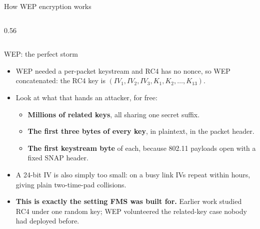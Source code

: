 \ifdefined\PRESENTATION\else\PassOptionsToClass{handout}{beamer}\fi\documentclass[aspectratio=169, lualatex]{beamer}
\begin{document}
\begin{frame}{How WEP encryption works}
\begin{columns}[c]
\begin{column}{0.56\textwidth}
\begin{center}
			\end{center}
		\end{column}
	\end{columns}
\end{frame}

\begin{frame}{WEP: the perfect storm}
	\begin{itemize}[<+->]
		\item WEP needed a per-packet keystream and RC4 has no nonce, so WEP concatenated: the RC4 key is $(IV_1, IV_2, IV_3, K_1, K_2, \ldots, K_{13})$.
		\item Look at what that hands an attacker, for free:
		      \begin{itemize}
			      \item \textbf{Millions of related keys}, all sharing one secret suffix.
			      \item \textbf{The first three bytes of every key}, in plaintext, in the packet header.
			      \item \textbf{The first keystream byte} of each, because 802.11 payloads open with a fixed SNAP header.
		      \end{itemize}
		\item A 24-bit IV is also simply too small: on a busy link IVs repeat within hours, giving plain two-time-pad collisions.
		\item \textbf{This is exactly the setting FMS was built for.} Earlier work studied RC4 under one random key; WEP volunteered the related-key case nobody had deployed before.
	\end{itemize}
\end{frame}
\end{document}
